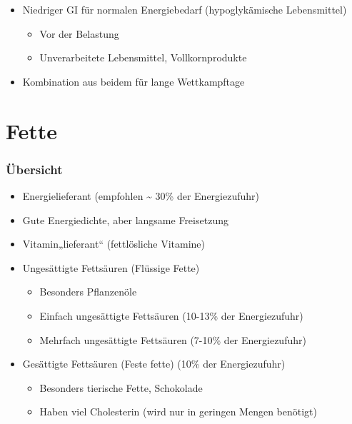 \documentclass[ngerman, aspectratio=169]{beamer}
\begin{document}
\begin{frame}[allowframebreaks]
\begin{itemize}
  \item Niedriger GI für normalen Energiebedarf (hypoglykämische Lebensmittel)
    \begin{itemize}
    \item Vor der Belastung
    \item Unverarbeitete Lebensmittel, Vollkornprodukte
    \end{itemize}

  \item Kombination aus beidem für lange Wettkampftage

  \end{itemize}
  
\end{frame}

\section{Fette}
\begin{frame}
  \frametitle{Übersicht}
  \begin{itemize}
  \item<+-> Energielieferant (empfohlen \~{} 30\% der Energiezufuhr)
  \item<+-> Gute Energiedichte, aber langsame Freisetzung
  \item<+-> Vitamin„lieferant“ (fettlösliche Vitamine)
  \item<+-> Ungesättigte Fettsäuren (Flüssige Fette)
    \begin{itemize}
    \item Besonders Pflanzenöle
    \item Einfach ungesättigte Fettsäuren (10-13\% der Energiezufuhr)
    \item Mehrfach ungesättigte Fettsäuren (7-10\% der Energiezufuhr)
    \end{itemize}

  \item<+-> Gesättigte Fettsäuren (Feste fette) (10\% der Energiezufuhr)
    \begin{itemize}
    \item Besonders tierische Fette, Schokolade
    \item Haben viel Cholesterin (wird nur in geringen Mengen benötigt)
    \end{itemize}

  \end{itemize}
\end{frame}
\end{document}
